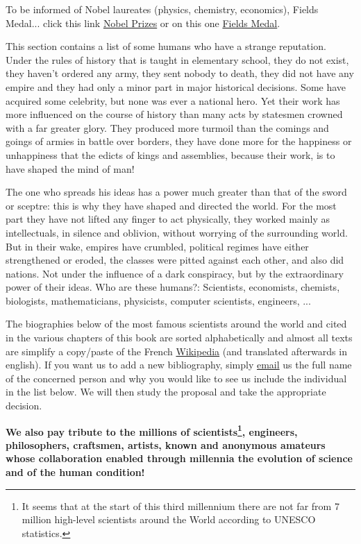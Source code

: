 	To be informed of Nobel laureates (physics, chemistry, economics), Fields Medal... click this link {\href{http://www.nobelprize.org/}{{\color{blue}Nobel Prizes}}} or on this one {\href{http://www.fields.utoronto.ca/aboutus/jcfields/fields_medal.html}{{\color{blue}Fields Medal}}}.
	
	This section contains a list of some humans who have a strange reputation. Under the rules of history that is taught in elementary school, they do not exist, they haven't ordered any army, they sent nobody to death, they did not have any empire and they had only a minor part in major historical decisions. Some have acquired some celebrity, but none was ever a national hero. Yet their work has more influenced on the course of history than many acts by statesmen crowned with a far greater glory. They produced more turmoil than the comings and goings of armies in battle over borders, they have done more for the happiness or unhappiness that the edicts of kings and assemblies, because their work, is to have shaped the mind of man!
	
	The one who spreads his ideas has a power much greater than that of the sword or sceptre: this is why they have shaped and directed the world. For the most part they have not lifted any finger to act physically, they worked mainly as intellectuals, in silence and oblivion, without worrying of the surrounding world. But in their wake, empires have crumbled, political regimes have either strengthened or eroded, the classes were pitted against each other, and also did nations. Not under the influence of a dark conspiracy, but by the extraordinary power of their ideas. Who are these humans?: Scientists, economists, chemists, biologists, mathematicians, physicists, computer scientists, engineers, ...
	
	The biographies below of the most famous scientists around the world and cited in the various chapters of this book are sorted alphabetically and almost all texts are simplify a copy/paste of the French {\href{http://www.wikipedia.fr}{{\color{blue}Wikipedia}}} (and translated afterwards in english). If you want us to add a new bibliography, simply {\href{mailto:isoz@sciences.ch}{{\color{blue}email}}} us the full name of the concerned person and why you would like to see us include the individual in the list below. We will then study the proposal and take the appropriate decision.
	
	\textbf{We also pay tribute to the millions of scientists\footnote{It seems that at the start of this third millennium there are not far from 7 million high-level scientists around the World according to UNESCO statistics.}, engineers, philosophers, craftsmen, artists, known and anonymous amateurs whose collaboration enabled through millennia the evolution of science and of the human condition!}
	
